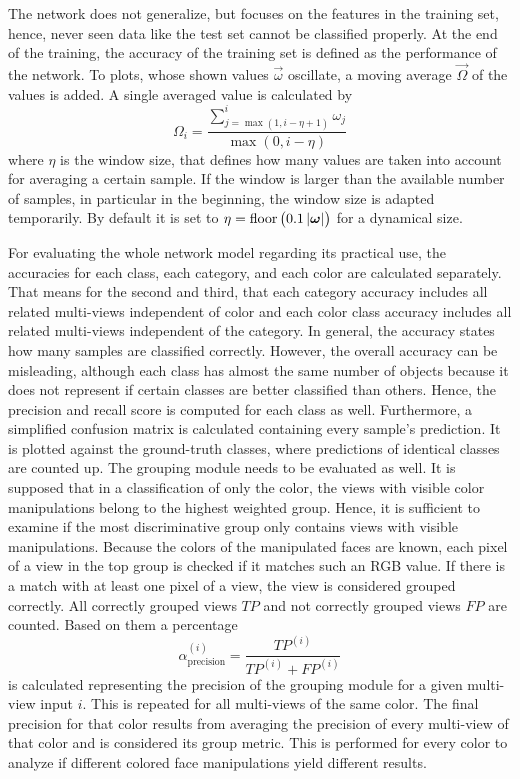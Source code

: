 The network does not generalize, but focuses on the features in the training set, hence, never seen data like the test set cannot be classified properly.
At the end of the training, the accuracy of the training set is defined as the performance of the network.
To plots, whose shown values $\vec{\omega}$ oscillate, a moving average $\vec{\Omega}$ of the values is added.
A single averaged value is calculated by
\begin{equation}
	\Omega_i = \frac{\sum_{j = \max(1,i-\eta+1)}^{i} \omega_j}{\max(0,i-\eta)}
\end{equation}
where $\eta$ is the window size, that defines how many values are taken into account for averaging a certain sample.
If the window is larger than the available number of samples, in particular in the beginning, the window size is adapted temporarily.
By default it is set to $\eta=\operatorname{floor}\left( 0.1 \left| \bm{\omega} \right| \right)$ for a dynamical size.

For evaluating the whole network model regarding its practical use, the accuracies for each class, each category, and each color are calculated separately.
That means for the second and third, that each category accuracy includes all related multi-views independent of color and each color class accuracy includes all related multi-views independent of the category.
In general, the accuracy states how many samples are classified correctly.
However, the overall accuracy can be misleading, although each class has almost the same number of objects because it does not represent if certain classes are better classified than others.
Hence, the precision and recall score is computed for each class as well.
Furthermore, a simplified confusion matrix is calculated containing every sample's prediction.
It is plotted against the ground-truth classes, where predictions of identical classes are counted up.
The grouping module needs to be evaluated as well.
It is supposed that in a classification of only the color, the views with visible color manipulations belong to the highest weighted group.
Hence, it is sufficient to examine if the most discriminative group only contains views with visible manipulations.
Because the colors of the manipulated faces are known, each pixel of a view in the top group is checked if it matches such an RGB value.
If there is a match with at least one pixel of a view, the view is considered grouped correctly.
All correctly grouped views $TP$ and not correctly grouped views $FP$ are counted.
Based on them a percentage
\begin{equation}
	\label{eq:metric-group}
	\alpha_{\text{precision}}^{(i)} = \frac{{TP}^{(i)}}{{TP}^{(i)} + {FP}^{(i)}}
\end{equation}
is calculated representing the precision of the grouping module for a given multi-view input $i$.
This is repeated for all multi-views of the same color.
The final precision for that color results from averaging the precision of every multi-view of that color and is considered its group metric.
This is performed for every color to analyze if different colored face manipulations yield different results. 

